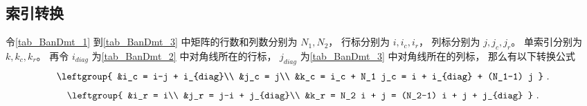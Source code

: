\subsection{索引转换}

令\autoref{tab_BanDmt_1} 到\autoref{tab_BanDmt_3} 中矩阵的行数和列数分别为 $N_1, N_2$， 行标分别为 $i, i_c, i_r$， 列标分别为 $j, j_c, j_r$。 单索引分别为 $k, k_c, k_r$。 再令 $i_{diag}$ 为\autoref{tab_BanDmt_2} 中对角线所在的行标， $j_{diag}$ 为\autoref{tab_BanDmt_3} 中对角线所在的列标， 那么有以下转换公式
\begin{equation}
\leftgroup{
&i_c = i-j + i_{diag}\\
&j_c = j\\
&k_c = i_c + N_1 j_c = i + i_{diag} + (N_1-1) j
}~.\end{equation}
\begin{equation}
\leftgroup{
&i_r = i\\
&j_r = j-i + j_{diag}\\
&k_r = N_2 i + j = (N_2-1) i + j + j_{diag}
}~.\end{equation}
